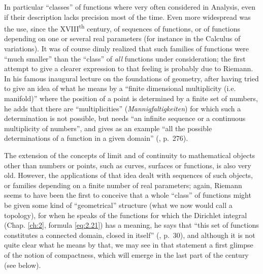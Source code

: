 \documentclass[12pt,a4paper,leqno,twoside]{extbook}
\newcommand{\supth}{\texorpdfstring{\textsuperscript{th}}{th}}
\begin{document}
In particular ``classes'' of functions where very often considered in Analysis, even if their description lacks precision most of the time. Even more widespread was the use, since the XVIII\supth{} century, of sequences of functions, or of functions depending on one or several real parameters (for instance in the Calculus of variations). It was of course dimly realized that such families of functions were ``much smaller'' than the ``class'' of \emph{all} functions under consideration; the first attempt to give a clearer expression to that feeling is probably due to Riemann. In his famous inaugural lecture on the foundations of geometry, after having tried to give an idea of what he means by a ``finite dimensional multiplicity (i.e. manifold)'' where the position of a point is determined by a finite set of numbers, he adds that there are ``multiplicities'' (\emph{Mannigfaltigkeiten}) for which such a determination is not possible, but needs ``an infinite sequence or a continuous multiplicity of numbers'', and gives as an example ``all the possible determinations of a function in a given domain'' (\cite{182}, p.~276).

The extension of the concepts of limit and of continuity to mathematical objects other than numbers or points, such as curves, surfaces or functions, is also very old. However, the applications of that idea dealt with sequences of such objects, or families depending on a finite number of real parameters; again, Riemann seems to have been the first to conceive that a whole ``class'' of functions might be given some kind of ``geometrical'' structure (what we now would call a topology), for when he speaks of the functions for which the Dirichlet integral (Chap. \ref{ch:2}, formula \eqref{eq:2.21}) has a meaning, he says that ``this set of functions constitutes a connected domain, closed in itself'' (\cite{182}, p.~30), and although it is not quite clear what he means by that, we may see in that statement a first glimpse of the notion of compactness, which will emerge in the last part of the century (see below).
\end{document}
